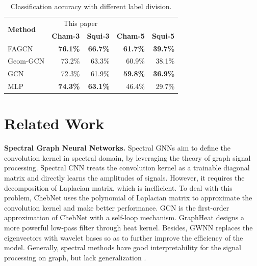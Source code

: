 \documentclass[letterpaper]{article} %
\begin{document}
\begin{table}[t]
  \centering
  \caption{Classification accuracy with different label division.}
    \begin{tabular}{lrrrr}
    \toprule
    \multirow{2}[4]{*}{\textbf{Method}} & \multicolumn{2}{c}{This paper} & \multicolumn{2}{c}{\cite{GeomGCN}} \\
\cmidrule(lr){2-3} \cmidrule(lr){4-5}          & \multicolumn{1}{c}{\textbf{Cham-3}} & \multicolumn{1}{c}{\textbf{Squi-3}} & \multicolumn{1}{c}{\textbf{Cham-5}} & \multicolumn{1}{c}{\textbf{Squi-5}} \\
    \midrule
    FAGCN		& \textbf{76.1\%} & \textbf{66.7\%} & \textbf{61.7\%} & \textbf{39.7\%} \\
    Geom-GCN	& 73.2\% & 63.3\% & 60.9\% & 38.1\% \\
    \midrule
    GCN   		& 72.3\% & 61.9\% & \textbf{59.8\%} & \textbf{36.9\%} \\
    MLP   		& \textbf{74.3\%} & \textbf{63.1\%} & 46.4\% & 29.7\% \\
    \bottomrule
    \end{tabular}
  \label{tab:compare}
\end{table}


\section{Related Work}


\textbf{Spectral Graph Neural Networks.} Spectral GNNs aim to define the convolution kernel in spectral domain, by leveraging the theory of graph signal processing. Spectral CNN \cite{SpectralCNN} treats the convolution kernel as a trainable diagonal matrix and directly learns the amplitudes of signals. However, it requires the decomposition of Laplacian matrix, which is inefficient. To deal with this problem, ChebNet \cite{ChebNet} uses the polynomial of Laplacian matrix to approximate the convolution kernel and make better performance. GCN \cite{GCN} is the first-order approximation of ChebNet with a self-loop mechanism. GraphHeat\cite{GraphHeat} designs a more powerful low-pass filter through heat kernel. Besides, GWNN \cite{GWNN} replaces the eigenvectors with wavelet bases so as to further improve the efficiency of the model. Generally, spectral methods have good interpretability for the signal processing on graph, but lack generalization \cite{GraphSAGE}.
\end{document}
